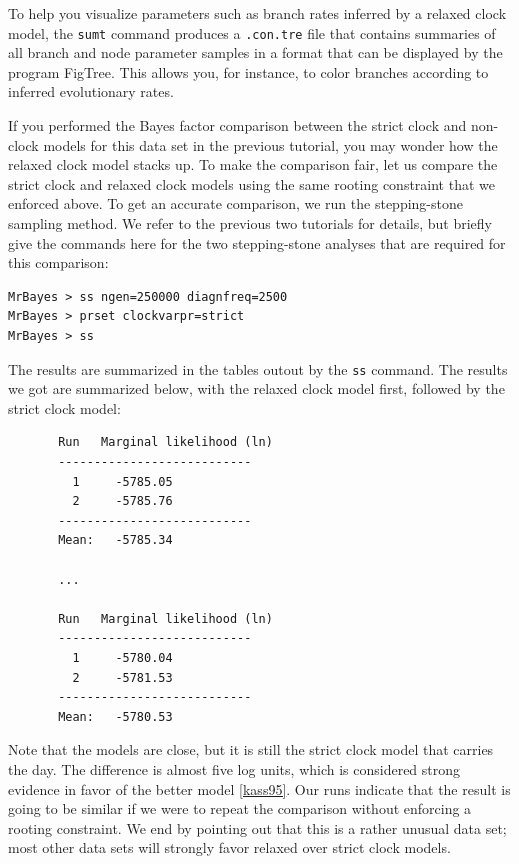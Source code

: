 \documentclass[12pt]{book}
\newcommand{\ttt}[1]{\texttt{#1} }
\begin{document}
To help you visualize parameters such as branch rates inferred by a relaxed clock model, the
\ttt{sumt} command produces a \ttt{.con.tre} file that contains summaries of all branch and node
parameter samples in a format that can be displayed by the program FigTree. This allows you, for
instance, to color branches according to inferred evolutionary rates.

If you performed the Bayes factor comparison between the strict clock and non-clock models for this
data set in the previous tutorial, you may wonder how the relaxed clock model stacks up. To make
the comparison fair, let us compare the strict clock and relaxed clock models using the same
rooting constraint that we enforced above. To get an accurate comparison, we run the stepping-stone
sampling method. We refer to the previous two tutorials for details, but briefly give the commands
here for the two stepping-stone analyses that are required for this comparison:

\begin{verbatim}
MrBayes > ss ngen=250000 diagnfreq=2500
MrBayes > prset clockvarpr=strict
MrBayes > ss
\end{verbatim}

The results are summarized in the tables outout by the \texttt{ss} command. The results we got are
summarized below, with the relaxed clock model first, followed by the strict clock model:

\footnotesize
\begin{singlespacing}
\begin{verbatim}
       Run   Marginal likelihood (ln)
       ---------------------------
         1     -5785.05   
         2     -5785.76   
       ---------------------------
       Mean:   -5785.34
       
       ...
       
       Run   Marginal likelihood (ln)
       ---------------------------
         1     -5780.04   
         2     -5781.53   
       ---------------------------
       Mean:   -5780.53
\end{verbatim}
\end{singlespacing}
\normalsize

Note that the models are close, but it is still the strict clock model that carries the day. The
difference is almost five log units, which is considered strong evidence in favor of the better
model \ref{kass95}. Our runs indicate that the result is going to be similar if we were to repeat
the comparison without enforcing a rooting constraint. We end by pointing out that this is a rather
unusual data set; most other data sets will strongly favor relaxed over strict clock models.
\end{document}

